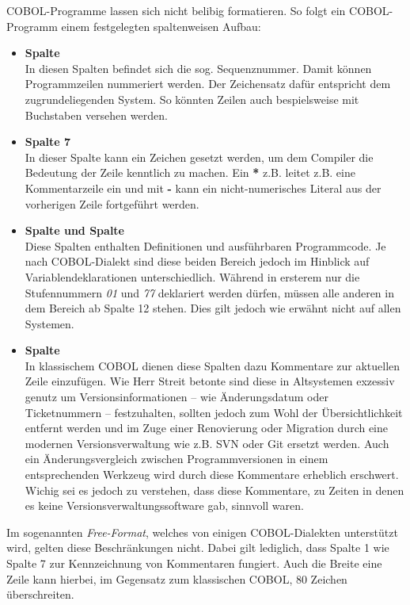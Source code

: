 COBOL-Programme lassen sich nicht belibig formatieren. So folgt ein COBOL-Programm einem festgelegten spaltenweisen Aufbau:
\begin{itemize}
    \item \textbf{Spalte }\\
    In diesen Spalten befindet sich die sog. Sequenznummer. Damit können Programmzeilen nummeriert werden. Der Zeichensatz dafür entspricht dem zugrundeliegenden System. So könnten Zeilen auch bespielsweise mit Buchstaben versehen werden.
    \item \textbf{Spalte 7}\\
    In dieser Spalte kann ein Zeichen gesetzt werden, um dem Compiler die Bedeutung der Zeile kenntlich zu machen. Ein \textbf{*} z.B. leitet z.B. eine Kommentarzeile ein und mit \textbf{-} kann ein nicht-numerisches Literal aus der vorherigen Zeile fortgeführt werden.
    \item \textbf{Spalte  und Spalte }\\
    Diese Spalten enthalten Definitionen und ausführbaren Programmcode. Je nach COBOL-Dialekt sind diese beiden Bereich jedoch im Hinblick auf Variablendeklarationen unterschiedlich. Während in ersterem nur die Stufennummern \textit{01} und \textit{77} deklariert werden dürfen, müssen alle anderen in dem Bereich ab Spalte 12 stehen. Dies gilt jedoch wie erwähnt nicht auf allen Systemen.
    \item \textbf{Spalte }\\
    In klassischem COBOL dienen diese Spalten dazu Kommentare zur aktuellen Zeile einzufügen. Wie Herr Streit betonte sind diese in Altsystemen exzessiv genutz um Versionsinformationen -- wie Änderungsdatum oder Ticketnummern -- festzuhalten, sollten jedoch zum Wohl der Übersichtlichkeit entfernt werden und im Zuge einer Renovierung oder Migration durch eine modernen Versionsverwaltung wie z.B. SVN oder Git ersetzt werden. Auch ein Änderungsvergleich zwischen Programmversionen in einem entsprechenden Werkzeug wird durch diese Kommentare erheblich erschwert. Wichig sei es jedoch zu verstehen, dass diese Kommentare, zu Zeiten in denen es keine Versionsverwaltungssoftware gab, sinnvoll waren.
\end{itemize}

Im sogenannten \textit{Free-Format}, welches von einigen COBOL-Dialekten unterstützt wird, gelten diese Beschränkungen nicht. Dabei gilt lediglich, dass Spalte 1 wie Spalte 7 zur Kennzeichnung von Kommentaren fungiert. Auch die Breite eine Zeile kann hierbei, im Gegensatz zum klassischen COBOL, 80 Zeichen überschreiten. 
